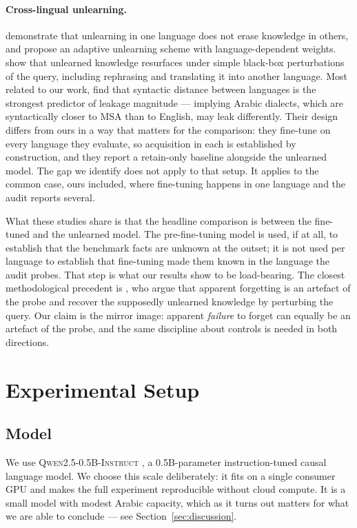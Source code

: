 \documentclass[11pt]{article}
\begin{document}
\paragraph{Cross-lingual unlearning.}
\citet{choi2024crosslingual} demonstrate that unlearning in one language does
not erase knowledge in others, and propose an adaptive unlearning scheme with
language-dependent weights.
\citet{doshi2024unlearn} show that unlearned knowledge resurfaces under simple
black-box perturbations of the query, including rephrasing and translating it
into another language.
Most related to our work, \citet{farashah2026multilingual} find that
syntactic distance between languages is the strongest predictor of leakage
magnitude — implying Arabic dialects, which are syntactically closer to MSA
than to English, may leak differently. Their design differs from ours in a
way that matters for the comparison: they fine-tune on every language they
evaluate, so acquisition in each is established by construction, and they
report a retain-only baseline alongside the unlearned model. The gap we
identify does not apply to that setup. It applies to the common case, ours
included, where fine-tuning happens in one language and the audit reports
several.

What these studies share is that the headline comparison is between the
fine-tuned and the unlearned model. The pre-fine-tuning model is used, if at
all, to establish
that the benchmark facts are unknown at the outset; it is not used per
language to establish that fine-tuning made them known in the language the
audit probes. That step is what our results show to be load-bearing. The
closest methodological precedent is \citet{doshi2024unlearn}, who argue that
apparent forgetting is an artefact of the probe and recover the supposedly
unlearned knowledge by perturbing the query. Our claim is the mirror image:
apparent \emph{failure} to forget can equally be an artefact of the probe,
and the same discipline about controls is needed in both directions.

\section{Experimental Setup}
\label{sec:setup}

\subsection{Model}
We use \textsc{Qwen2.5-0.5B-Instruct} \citep{qwen2025qwen25}, a 0.5B-parameter
instruction-tuned causal language model.
We choose this scale deliberately: it fits on a single consumer GPU and makes
the full experiment reproducible without cloud compute. It is a small model
with modest Arabic capacity, which as it turns out matters for what we are
able to conclude — see Section~\ref{sec:discussion}.
\end{document}
